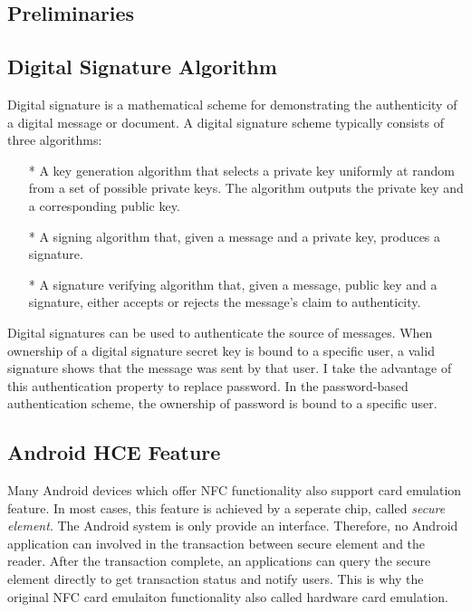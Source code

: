 \begin{CJK}{Bg5}{bsmi}


\chapter{Preliminaries}

\section{Digital Signature Algorithm}

Digital signature is a mathematical scheme for demonstrating the authenticity of a digital message or document. A digital signature scheme typically consists of three algorithms:

\begin{enumerate}
\item[*] A key generation algorithm that selects a private key uniformly at random from a set of possible private keys. The algorithm outputs the private key and a corresponding public key.
\item[*] A signing algorithm that, given a message and a private key, produces a signature.
\item[*] A signature verifying algorithm that, given a message, public key and a signature, either accepts or rejects the message's claim to authenticity.
\end{enumerate}

Digital signatures can be used to authenticate the source of messages. When ownership of a digital signature secret key is bound to a specific user, a valid signature shows that the message was sent by that user. I take the advantage of this authentication property to replace password. In the password-based authentication scheme, the ownership of password is bound to a specific user. 

\section{Android HCE Feature}

Many Android devices which offer NFC functionality also support card emulation feature. In most cases, this feature is achieved by a seperate chip, called \emph{secure element}. The Android system is only provide an interface. Therefore, no Android application can involved in the transaction between secure element and the reader. After the transaction complete, an applications can query the secure element directly to get transaction status and notify users. This is why the original NFC card emulaiton functionality also called hardware card emulation.


\end{CJK}
